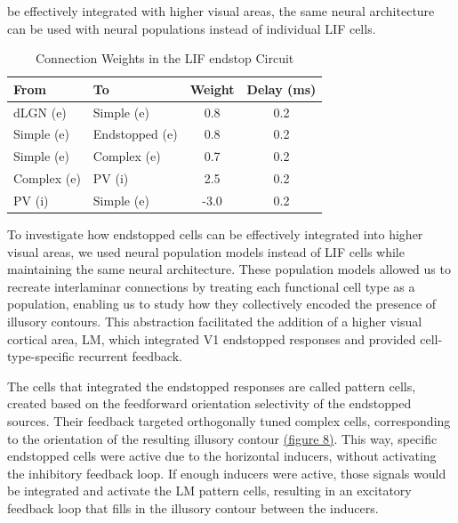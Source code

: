\documentclass[12pt]{article}
\begin{document}
be effectively integrated with higher visual areas, the same neural architecture can be used with neural populations instead of individual LIF cells. 

\begin{table}[h]
  \centering
  \caption{Connection Weights in the LIF endstop Circuit}
  \begin{tabular}{@{}llcc@{}}
      \toprule
      \textbf{From} & \textbf{To} & \textbf{Weight} & \textbf{Delay (ms)} \\ \midrule
      dLGN (e) & Simple (e) & 0.8 & 0.2 \\
      Simple (e) & Endstopped (e) & 0.8 & 0.2 \\
      Simple (e) & Complex (e) & 0.7 & 0.2 \\
      Complex (e) & PV (i) & 2.5 & 0.2 \\
      PV (i) & Simple (e) & -3.0 & 0.2 \\ \bottomrule
  \end{tabular}
\end{table}

To investigate how endstopped cells can be effectively integrated into higher visual areas, we used neural population models instead of LIF cells while maintaining the same neural architecture. These population models allowed us to recreate interlaminar connections by treating each functional cell type as a population, enabling us to study how they collectively encoded the presence of illusory contours. This abstraction facilitated the addition of a higher visual cortical area, LM, which integrated V1 endstopped responses and provided cell-type-specific recurrent feedback.

The cells that integrated the endstopped responses are called pattern cells, created based on the feedforward orientation selectivity of the endstopped sources. Their feedback targeted orthogonally tuned complex cells, corresponding to the orientation of the resulting illusory contour \hyperref[fig:illusory_filling]{(figure 8)}. This way, specific endstopped cells were active due to the horizontal inducers, without activating the inhibitory feedback loop. If enough inducers were active, those signals would be integrated and activate the LM pattern cells, resulting in an excitatory feedback loop that fills in the illusory contour between the inducers.
\end{document}
